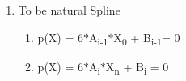 \documentclass[12pt]{article}
\renewcommand{\_}{\kern-1.5pt\textunderscore\kern-1.5pt}
\begin{document}
\begin{enumerate}
\begin{enumerate}
\begin{enumerate}
\end{enumerate}
	\item To be natural Spline\par

\begin{enumerate}
	\item p(X) = 6$\ast$A\textsubscript{i-1}$\ast$X\textsubscript{0} + B\textsubscript{i-1}= 0\par

	\item p(X) = 6$\ast$A\textsubscript{i}$\ast$X\textsubscript{n} + B\textsubscript{i} = 0
\end{enumerate}
\end{enumerate}
\end{enumerate}\par


\vspace{\baselineskip}

\printbibliography
\end{document}
